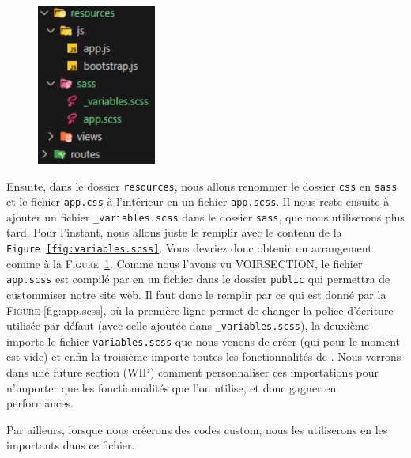 \documentclass[internal]{nhitec_design}
\begin{document}
\begin{figure}
    \vspace{-0.5cm}
    \includegraphics[width=0.35\textwidth]{figures-C1/bs_setup.pdf}
    \caption{\label{fig:bs_setup}}
\end{figure}
Ensuite, dans le dossier \verb|resources|, nous allons renommer le dossier \verb|css| en \verb|sass| et le fichier \verb|app.css| à l'intérieur en un fichier \verb|app.scss|. Il nous reste ensuite à ajouter un fichier \verb|_variables.scss| dans le dossier \verb|sass|, que nous utiliserons plus tard. Pour l'instant, nous allons juste le remplir avec le contenu de la \texttt{Figure~\ref{fig:variables.scss}}. Vous devriez donc obtenir un arrangement comme à la \textsc{Figure~\ref{fig:bs_setup}}. Comme nous l'avons vu VOIRSECTION, le fichier \verb|app.scss| est compilé par \vite{} en un fichier \css{} dans le dossier \verb|public| qui permettra de custommiser notre site web. Il faut donc le remplir par ce qui est donné par la \textsc{Figure }\ref{fig:app.scss}, où la première ligne permet de changer la police d'écriture utilisée par défaut (avec celle ajoutée dans \verb|_variables.scss|), la deuxième importe le fichier \verb|variables.scss| que nous venons de créer (qui pour le moment est vide) et enfin la troisième importe toutes les fonctionnalités de \bs{}. Nous verrons dans une future section (WIP) comment personnaliser ces importations pour n'importer que les fonctionnalités que l'on utilise, et donc gagner en performances. 

Par ailleurs, lorsque nous créerons des codes \sass{} custom, nous les utiliserons en les importants dans ce fichier.
\end{document}
